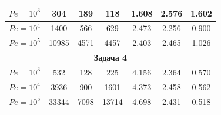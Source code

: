 \begin{center}
\begin{tabular}{|c|c|c|c|c|c|c|}
$Pe=10^3$ & 304 & 189 & 118 & 1.608 & 2.576 & 1.602 \\ 


\hline 


$Pe=10^4$ & 1400 & 566 & 629 & 2.473 & 2.256 & 0.900 \\ 


\hline 


$Pe=10^5$ & 10985 & 4571 & 4457 & 2.403 & 2.465 & 1.026 \\ 


\hline 


\multicolumn{7}{|c|}{\bf Задача 4}\\ 


\hline 


$Pe=10^3$ & 532 & 128 & 225 & 4.156 & 2.364 & 0.570 \\ 


\hline 


$Pe=10^4$ & 3936 & 900 & 1601 & 4.373 & 2.458 & 0.562 \\ 


\hline 


$Pe=10^5$ & 33344 & 7098 & 13714 & 4.698 & 2.431 & 0.518 \\ 


\hline 


\end{tabular} 


\end{center} 


 


